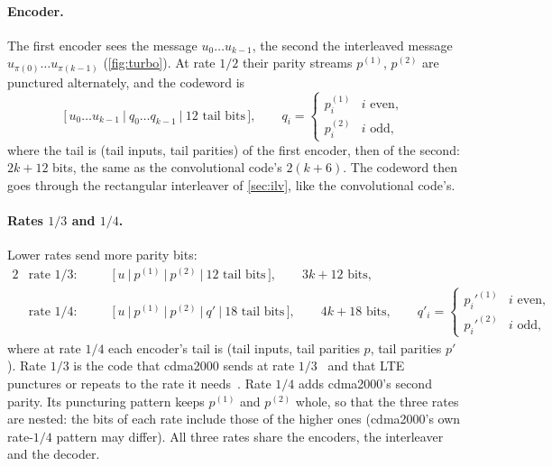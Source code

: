 \documentclass[11pt,a4paper]{article}
\theoremstyle{remark}
\begin{document}
\paragraph{Encoder.}
The first encoder sees the message $u_0 \dots u_{k-1}$, the second the interleaved message $u_{\pi(0)} \dots u_{\pi(k-1)}$ (\cref{fig:turbo}). At rate $1/2$ their parity streams $p^{(1)}$, $p^{(2)}$ are punctured alternately, and the codeword is
\begin{equation}
\bigl[\, u_0 \dots u_{k-1} \ \big|\ q_0 \dots q_{k-1} \ \big|\ \text{12 tail bits} \,\bigr], \qquad q_i = \begin{cases} p_i^{(1)} & i \text{ even},\\ p_i^{(2)} & i \text{ odd}, \end{cases}
\end{equation}
where the tail is (tail inputs, tail parities) of the first encoder, then of the second: $2k + 12$ bits, the same as the convolutional code's $2(k+6)$. The codeword then goes through the rectangular interleaver of \cref{sec:ilv}, like the convolutional code's.

\paragraph{Rates $1/3$ and $1/4$.}
Lower rates send more parity bits:
\begin{alignat}{2}
&\text{rate } 1/3: &\quad& \bigl[\, u \ \big|\ p^{(1)} \ \big|\ p^{(2)} \ \big|\ \text{12 tail bits} \,\bigr], \qquad 3k + 12 \text{ bits},\\
&\text{rate } 1/4: && \bigl[\, u \ \big|\ p^{(1)} \ \big|\ p^{(2)} \ \big|\ q' \ \big|\ \text{18 tail bits} \,\bigr], \qquad 4k + 18 \text{ bits}, \qquad q'_i = \begin{cases} p_i'^{(1)} & i \text{ even},\\ p_i'^{(2)} & i \text{ odd}, \end{cases}
\end{alignat}
where at rate $1/4$ each encoder's tail is (tail inputs, tail parities $p$, tail parities $p'$). Rate $1/3$ is the code that cdma2000 sends at rate $1/3$~\cite{cdma2000} and that LTE punctures or repeats to the rate it needs~\cite{ts36212}. Rate $1/4$ adds cdma2000's second parity. Its puncturing pattern keeps $p^{(1)}$ and $p^{(2)}$ whole, so that the three rates are nested: the bits of each rate include those of the higher ones (cdma2000's own rate-$1/4$ pattern may differ). All three rates share the encoders, the interleaver and the decoder.
\end{document}
